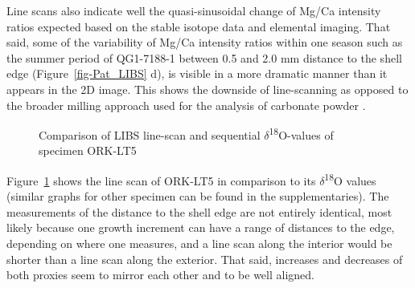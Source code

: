 \documentclass[
  authoryear,
  preprint,
  3p]{elsarticle}
\begin{document}
Line scans also indicate well the quasi-sinusoidal change of Mg/Ca
intensity ratios expected based on the stable isotope data and elemental
imaging. That said, some of the variability of Mg/Ca intensity ratios
within one season such as the summer period of QG1-7188-1 between 0.5
and 2.0 mm distance to the shell edge (Figure~\ref{fig-Pat_LIBS} d), is
visible in a more dramatic manner than it appears in the 2D image. This
shows the downside of line-scanning as opposed to the broader milling
approach used for the analysis of carbonate powder
\citep{Ferguson2011-zl}.

\begin{figure}


\caption{\label{fig-Pat_Comp}Comparison of LIBS line-scan and sequential
\(\delta\)\textsuperscript{18}O-values of specimen ORK-LT5}

\end{figure}%

Figure~\ref{fig-Pat_Comp} shows the line scan of ORK-LT5 in comparison
to its \(\delta\)\textsuperscript{18}O values (similar graphs for other
specimen can be found in the supplementaries). The measurements of the
distance to the shell edge are not entirely identical, most likely
because one growth increment can have a range of distances to the edge,
depending on where one measures, and a line scan along the interior
would be shorter than a line scan along the exterior. That said,
increases and decreases of both proxies seem to mirror each other and to
be well aligned.
\end{document}
